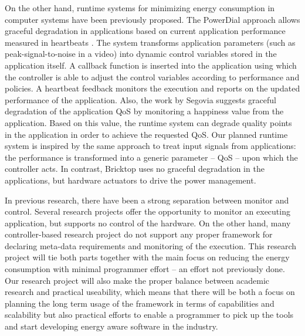 \documentclass{article}
\begin{document}
On the other hand, runtime systems for minimizing energy consumption in computer systems have been previously proposed.
The PowerDial \cite{Hoffmann:11} approach allows graceful degradation in applications based on current application performance measured in heartbeats \cite{Hoffmann:10}. 
The system transforms application parameters (such as peak-signal-to-noise in a video) into dynamic control variables stored in the application itself. 
A callback function is inserted into the application using which the controller is able to adjust the control variables according to performance and policies.
A heartbeat feedback monitors the execution and reports on the updated performance of the application. 
Also, the work by Segovia \cite{Segovia:11} suggests graceful degradation of the application QoS by monitoring a happiness value from the application. 
Based on this value, the runtime system can degrade quality points in the application in order to achieve the requested QoS. 
Our planned runtime system is inspired by the same approach to treat input signals from applications: the performance is transformed into a generic parameter – QoS – upon which the controller acts.
In contrast, Bricktop uses no graceful degradation in the applications, but
hardware actuators to drive the power management.

In previous research, there have been a strong separation between monitor and control.
Several research projects offer the opportunity to monitor an executing application, but supports no control of the hardware.
On the other hand, many controller-based research project do not support any proper framework for declaring meta-data requirements and monitoring of the execution.
This research project will tie both parts together with the main focus on reducing the energy consumption with minimal programmer effort -- an effort not previously done.
Our research project will also make the proper balance between academic research and practical useability,
which means that there will be both a focus on planning the long term usage of the framework in terms of capabilities and scalability but also practical efforts to enable a programmer to pick up the tools and start developing energy aware software in the industry.
\end{document}
